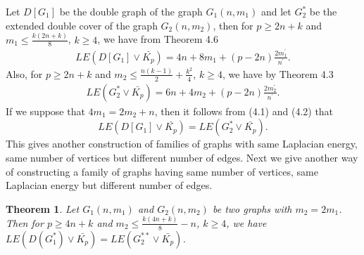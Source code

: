 \documentclass[12pt,a4paper]{amsart}
\newtheorem{theorem}{Theorem}[section]
\theoremstyle{theorem}
\theoremstyle{definition}
\numberwithin{equation}{section} \makeatletter
\begin{document}
\indent Let $D[G_1]$ be the double graph of the graph $G_1(n,m_1)$ and let $G_2^*$ be the extended double cover of the graph $G_2(n,m_2)$, then for $p\geq 2n+k$ and $m_1\leq \frac{k(2n+k)}{8}$, $k\geq 4$, we have from Theorem 4.6
\begin{align}
LE(D[G_1]\vee \bar{K_p})=4n+8m_1+(p-2n)\frac{2m_1^{\prime}}{n^{\prime}}.
\end{align}
Also, for $p\geq 2n+k$ and $m_2\leq \frac{n(k-1)}{2}+\frac{k^2}{4}$, $k\geq 4$, we have by Theorem 4.3
\begin{align}
LE(G_2^*\vee \bar{K_p})=6n+4m_2+(p-2n)\frac{2m_2^{\prime}}{n^{\prime}}.
\end{align}
\indent If we suppose that $4m_1=2m_2+n$, then it follows from (4.1) and (4.2) that $$LE(D[G_1]\vee \bar{K_p})=LE(G_2^*\vee \bar{K_p}).$$
\indent This gives another construction of families of graphs with same Laplacian energy, same number of vertices but different number of edges. Next we give another way of constructing a family of graphs having same number of vertices, same Laplacian energy but different number of edges.
\begin{theorem}
Let $G_1(n,m_1)$ and $G_2(n,m_2)$ be two graphs with $m_2=2m_1$. Then for $p\geq 4n+k$ and $m_2\leq \frac{k(4n+k)}{8}-n$, $k\geq 4$, we have $LE(D(G_1^*)\vee \bar{K_p})=LE(G_2^{**}\vee \bar{K_p})$.
\end{theorem}
\end{document}
